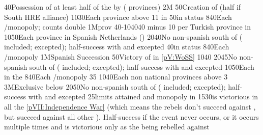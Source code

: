 %
%
%
{}{40}{Possession of at least half of the \payshongrie by \AUSaus (
  provinces)}%
%
\EUobjective2M{}{}%
{}{50}{Creation of  (half if South HRE alliance)}%
%
%
{10}{30}{Each province above 11 in \AUSaus}%
%
%
{}{50}{\paysportugal in \ANNEXION status}%
%
%
{8}{40}{Each \CTZ/\STZ monopoly;  counts double}%
%
%
\EUobjective1M{\payshongrie}{\TUR prov}%
{40-10}{40}{40 \VPs minus 10 \VPs per Turkish province in \payshongrie}%
%
%
{10}{50}{Each province in Spanish Netherlands (\regionBelgique)}%
%
%
{20}{40}{No non-spanish \COL south of 
  ( included;  excepted); half-success
  with  and  excepted}%
%
%
{}{40}{\paysportugal in \ANNEXION status}%
%
%
{8}{40}{Each \CTZ/\STZ monopoly}%
%
%
\EUobjective1M{Spanish Succession}{}%
{}{50}{Victory of \SPA in \ref{pV:WoSS}}%
%
%
{10}{40}{}%
%
%
{20}{45}{No non-spanish \COL south of 
  ( included;  excepted); half-success
  with  and  excepted}%
%
%
{10}{50}{Each \Presidio in the }%
%
%
{8}{40}{Each \CTZ/\STZ monopoly}%
%
%
%
{}{35}{}%
%
%
{10}{40}{Each non national provinces above 3}%
%
\EUobjective3M{Exclusive below }{}%
{20}{50}{No non-spanish \COL south of 
  ( included;  excepted); half-success
  with  and  excepted}%
%
%
{}{25}{\MNU limits attained and monopoly in }%
%
%
{15}{30}{\SPA is victorious in all the \ref{pVII:Independence War} (which
  means the rebels don't succeed against \SPA, but succeed against all other
  \MAJ). Half-success if the event never occurs, or it occurs multiple times
  and \SPA is victorious only as the \MAJ being rebelled against }%
